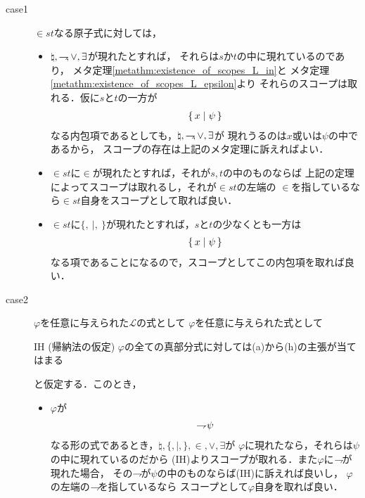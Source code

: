 	\begin{metaprf}\mbox{}
		\begin{description}
			\item[case1] $\in st$なる原子式に対しては，
				\begin{itemize}
					\item $\natural,\rightharpoondown\hspace{-0.25em},\vee,\exists$が現れたとすれば，
						それらは$s$か$t$の中に現れているのであり，
						メタ定理\ref{metathm:existence_of_scopes_L_in}と
						メタ定理\ref{metathm:existence_of_scopes_L_epsilon}より
						それらのスコープは取れる．仮に$s$と$t$の一方が
						\begin{align}
							\{\, x \mid \psi\, \}
						\end{align}
						なる内包項であるとしても，$\natural,\rightharpoondown\hspace{-0.25em},\vee,\exists$が
						現れうるのは$x$或いは$\psi$の中であるから，
						スコープの存在は上記のメタ定理に訴えればよい．
				
					\item $\in st$に$\in$が現れたとすれば，それが$s,t$の中のものならば
						上記の定理によってスコープは取れるし，それが$\in st$の左端の
						$\in$を指しているなら$\in st$自身をスコープとして取れば良い．
						
					\item $\in st$に$\{,\ |,\ \}$が現れたとすれば，$s$と$t$の少なくとも一方は
						\begin{align}
							\{\, x \mid \psi\, \}
						\end{align}
						なる項であることになるので，スコープとしてこの内包項を取れば良い．
				\end{itemize}
				
			\item[case2] $\varphi$を任意に与えられた$\mathcal{L}$の式として
				$\varphi$を任意に与えられた式として
				\begin{itembox}[l]{IH (帰納法の仮定)}
					$\varphi$の全ての真部分式に対しては(a)から(h)の主張が当てはまる
				\end{itembox}
				と仮定する．このとき，
				\begin{itemize}
					\item $\varphi$が
						\begin{align}
							\rightharpoondown\hspace{-0.25em} \psi
						\end{align}
						なる形の式であるとき，$\natural,\{,|,\},\in,\vee,\exists$が
						$\varphi$に現れたなら，それらは$\psi$の中に現れているのだから
						(IH)よりスコープが取れる．また$\varphi$に$\rightharpoondown\hspace{-0.25em}$が現れた場合，
						その$\rightharpoondown\hspace{-0.25em}$が$\psi$の中のものならば(IH)に訴えれば良いし，
						$\varphi$の左端の$\rightharpoondown\hspace{-0.25em}$を指しているなら
						スコープとして$\varphi$自身を取れば良い．
						

\end{itemize}
\end{description}
\end{metaprf}
